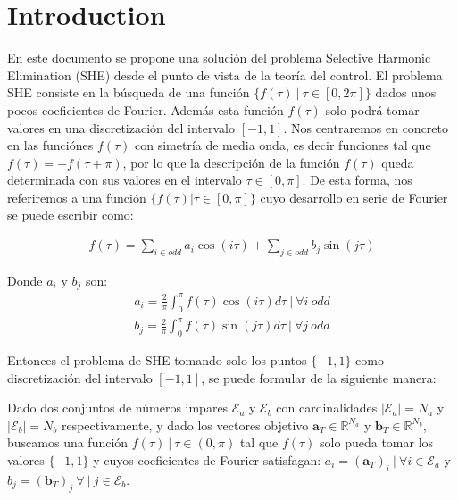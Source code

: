 \chapter{Introduction}

%
En este documento se propone una solución del problema Selective Harmonic Elimination (SHE) desde el punto de vista de la teoría del control. 
%
El problema SHE consiste en la búsqueda de una función $\{ f(\tau ) \ | \ \tau \in [0,2\pi] \}$ dados unos pocos coeficientes de Fourier. Además esta función $f(\tau)$ solo podrá tomar valores en una discretización del intervalo $[-1,1]$. Nos centraremos en concreto en las funciónes $f(\tau)$ con simetría de media onda, es decir funciones tal que $f(\tau) = -f(\tau + \pi)$, por lo que la descripción de la función $f(\tau)$ queda determinada con sus valores en el intervalo $\tau \in [0,\pi]$. De esta forma, nos referiremos a una función $\{ f(\tau)  | \tau \in [0,\pi] \}$ cuyo desarrollo en serie de Fourier se puede escribir como:

\begin{gather}
    f(\tau ) = \sum_{i \in odd} a_i \cos(i\tau)+ \sum_{j \in odd}  b_j \sin(j \tau) 
\end{gather}

Donde $a_i$ y $b_j$  son:
\begin{gather}
    a_i = \frac{2}{\pi} \int_0^\pi f(\tau ) \cos(i \tau)d\tau \ | \ \forall i \ odd \label{an}\\
    b_j = \frac{2}{\pi} \int_0^\pi f(\tau)  \sin(j \tau) d\tau \ | \ \forall j \ odd \label{bn}
\end{gather}


Entonces el problema de SHE tomando solo los puntos $\{-1,1\}$ como discretización del intervalo $[-1,1]$, se puede formular de la siguiente manera:

\begin{problem}\label{SHEp}
    Dado dos conjuntos de números impares $\mathcal{E}_a$ y $\mathcal{E}_b$ con cardinalidades $|\mathcal{E}_a| = N_a$ y  $|\mathcal{E}_b| = N_b$ respectivamente, y dado los vectores objetivo $\bm{a}_T  \in \mathbb{R}^{N_a}$ y $\bm{b}_T  \in \mathbb{R}^{N_b}$, buscamos una función  $f(\tau ) \ | \ \tau \in (0,\pi)$ tal que $f(\tau)$ solo pueda tomar los valores  $\{-1,1\}$ y cuyos coeficientes de Fourier satisfagan: $ a_i = (\bm{a}_T)_i \ | \ \forall i \in \mathcal{E}_a$ y  $b_j = (\bm{b}_T)_j \ \forall \ | \  j \in \mathcal{E}_b$. 
\end{problem}


